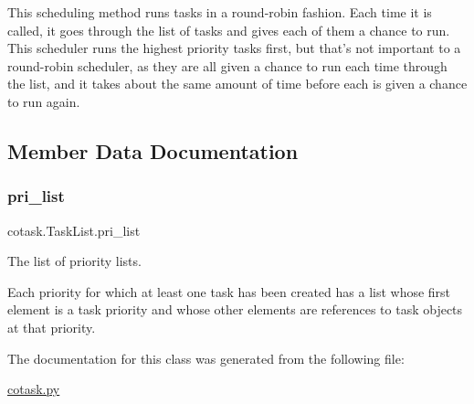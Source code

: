 \begin{DoxyVerb}This scheduling method runs tasks in a round-robin fashion. Each
time it is called, it goes through the list of tasks and gives each of
them a chance to run. This scheduler runs the highest priority tasks 
first, but that's not important to a round-robin scheduler, as they 
are all given a chance to run each time through the list, and it takes
about the same amount of time before each is given a chance to run 
again. \end{DoxyVerb}
 

\subsection{Member Data Documentation}
\mbox{\label{classcotask_1_1_task_list_aac6e53cb4fec80455198ff85c85a4b51}} 
\subsubsection{\texorpdfstring{pri\_list}{pri\_list}}
{\footnotesize\ttfamily cotask.\+Task\+List.\+pri\+\_\+list}



The list of priority lists. 

Each priority for which at least one task has been created has a list whose first element is a task priority and whose other elements are references to task objects at that priority. 

The documentation for this class was generated from the following file\+:\begin{DoxyCompactItemize}
\item 
\mbox{\hyperlink{cotask_8py}{cotask.\+py}}\end{DoxyCompactItemize}
